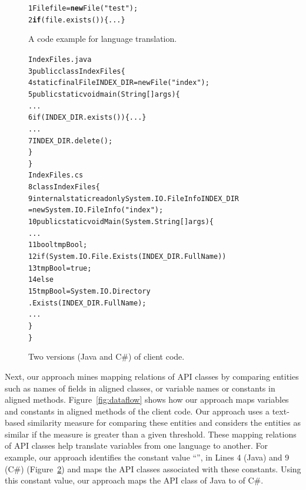 \begin{figure}[t]
\begin{CodeOut}
\begin{alltt}
1  File file = \textbf{new} File("test");
2    \textbf{if}(file.exists())\{...\}
\end{alltt}
\end{CodeOut}\vspace*{-4ex}
\caption{\label{fig:totranslation} A code example for language
translation.}%
\end{figure}
\begin{figure}[t]
\begin{CodeOut}\vspace*{-2ex}
\begin{alltt}
                  IndexFiles.java
3 public class IndexFiles \{
4   static final File INDEX_DIR = new File("index");
5   public static void main(String[] args) \{
      ...
6     if (INDEX_DIR.exists()) \{...\}
      ...
7       INDEX_DIR.delete();
    \}
  \}
                  IndexFiles.cs
8 class IndexFiles\{
9   internal static readonly System.IO.FileInfo INDEX_DIR
          = new System.IO.FileInfo("index");
10   public static void  Main(System.String[] args)\{
      ...
11     bool tmpBool;
12     if (System.IO.File.Exists(INDEX_DIR.FullName))
13       tmpBool = true;
14    else
15       tmpBool = System.IO.Directory
                         .Exists(INDEX_DIR.FullName);
      ...
    \}
 \}
\end{alltt}
\end{CodeOut}\vspace*{-4ex}
\caption{\label{fig:clientcode} Two versions (Java and C\#) of
client code.}\vspace*{-2ex}
\end{figure}

Next, our approach mines mapping relations of API classes by comparing entities such as
names of fields in aligned classes, or variable names or constants in aligned methods. 
Figure~\ref{fig:dataflow} shows how our approach maps variables and constants in aligned methods 
of the client code. Our approach uses a text-based similarity measure for comparing these entities
and considers the entities as similar if the measure is greater than a given threshold.
These mapping relations of API classes help translate variables from one language to another. 
For example, our approach identifies the constant value ``'',
in Lines 4 (Java) and 9 (C\#) (Figure~\ref{fig:clientcode}) and
maps the API classes associated with these constants. 
Using this constant value, our approach maps the API
class  of Java to  of C\#.  

